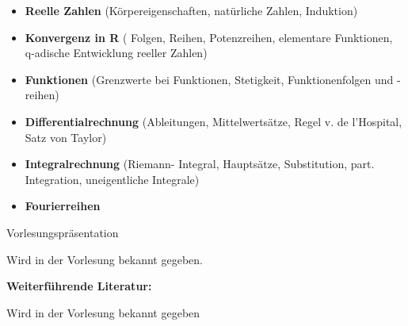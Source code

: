\begin{course}
\begin{content}
\begin{itemize}\item \textbf{Reelle Zahlen }(Körpereigenschaften, natürliche Zahlen, Induktion)  \item \textbf{Konvergenz in R} ( Folgen, Reihen, Potenzreihen, elementare Funktionen, q-adische Entwicklung reeller Zahlen)  \item \textbf{Funktionen }(Grenzwerte bei Funktionen, Stetigkeit, Funktionenfolgen und -reihen)  \item \textbf{Differentialrechnung} (Ableitungen, Mittelwertsätze, Regel v. de l'Hospital, Satz von Taylor)  \item \textbf{Integralrechnung} (Riemann- Integral, Hauptsätze, Substitution, part. Integration, uneigentliche Integrale)  \item \textbf{Fourierreihen}  \end{itemize}
\end{content}

\begin{media}Vorlesungspräsentation

\end{media}

\begin{literature}Wird in der Vorlesung bekannt gegeben.

\textbf{Weiterführende Literatur:}

Wird in der Vorlesung bekannt gegeben

\end{literature}



\end{course}
